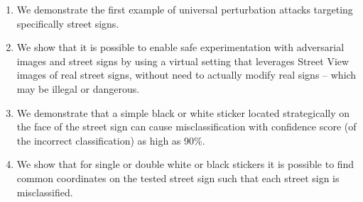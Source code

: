 \begin{enumerate}

    \item We demonstrate the first example of universal perturbation attacks targeting specifically street signs.

    \item We show that it is possible to enable safe experimentation with adversarial images and street signs by using a virtual setting that leverages Street View images of real street signs, without need to actually modify real signs -- which may be illegal or dangerous.

    \item We demonstrate that a simple black or white sticker located strategically on the face of the street sign can cause misclassification with confidence score (of the incorrect classification) as high as 90\%.

    \item We show that for single or double white or black stickers it is possible to find common coordinates on the tested street sign such that each street sign is misclassified.

\end{enumerate}


    



